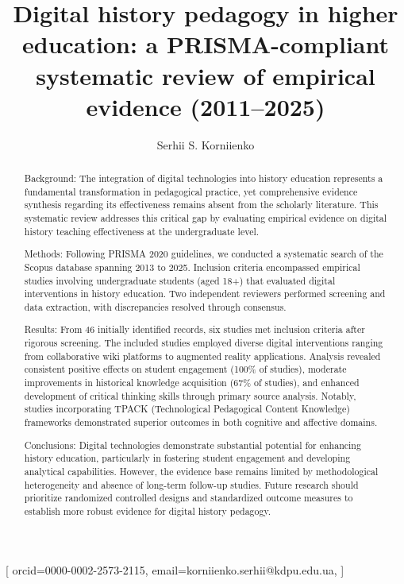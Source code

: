 \documentclass[
hf,
]{ceurart}
\begin{document}
\title{Digital history pedagogy in higher education: a PRISMA-compliant systematic review of empirical evidence (2011--2025)}

\author{Serhii S. Korniienko}[%
orcid={0000-0002-2573-2115},
email={korniienko.serhii@kdpu.edu.ua},
]


\address{Kryvyi Rih State Pedagogical University,
	54 Universytetskyi Ave., Kryvyi Rih, 50086, Ukraine}



\begin{abstract}
Background: The integration of digital technologies into history education represents a fundamental transformation in pedagogical practice, yet comprehensive evidence synthesis regarding its effectiveness remains absent from the scholarly literature. This systematic review addresses this critical gap by evaluating empirical evidence on digital history teaching effectiveness at the undergraduate level.

Methods: Following PRISMA 2020 guidelines, we conducted a systematic search of the Scopus database spanning 2013 to 2025. Inclusion criteria encompassed empirical studies involving undergraduate students (aged 18+) that evaluated digital interventions in history education. Two independent reviewers performed screening and data extraction, with discrepancies resolved through consensus.

Results: From 46 initially identified records, six studies met inclusion criteria after rigorous screening. The included studies employed diverse digital interventions ranging from collaborative wiki platforms to augmented reality applications. Analysis revealed consistent positive effects on student engagement (100\% of studies), moderate improvements in historical knowledge acquisition (67\% of studies), and enhanced development of critical thinking skills through primary source analysis. Notably, studies incorporating TPACK (Technological Pedagogical Content Knowledge) frameworks demonstrated superior outcomes in both cognitive and affective domains.

Conclusions: Digital technologies demonstrate substantial potential for enhancing history education, particularly in fostering student engagement and developing analytical capabilities. However, the evidence base remains limited by methodological heterogeneity and absence of long-term follow-up studies. Future research should prioritize randomized controlled designs and standardized outcome measures to establish more robust evidence for digital history pedagogy.
\end{abstract}
\end{document}

